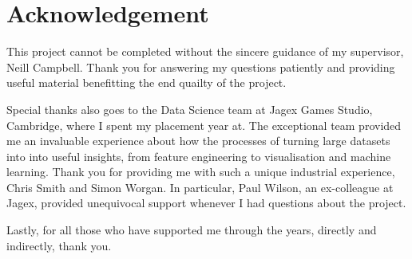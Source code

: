 \documentclass[dissertation.tex]{subfiles}
\begin{document}
\chapter{Acknowledgement}
This project cannot be completed without the sincere guidance of my supervisor, Neill Campbell. Thank you for answering my questions patiently and providing useful material benefitting the end quailty of the project. 

Special thanks also goes to the Data Science team at Jagex Games Studio, Cambridge,  where I spent my placement year at. The exceptional team provided me an invaluable experience about how the processes of turning large datasets into into useful insights, from feature engineering to visualisation and machine learning. Thank you for providing me with such a unique industrial experience, Chris Smith and Simon Worgan. In particular, Paul Wilson, an ex-colleague at Jagex, provided unequivocal support whenever I had questions about the project.  

Lastly, for all those who have supported me through the years, directly and indirectly, thank you.
\end{document}
